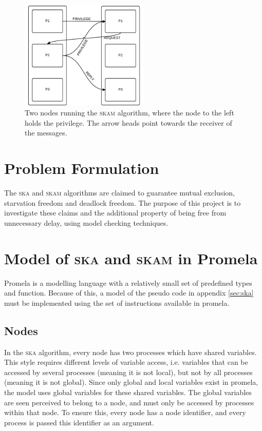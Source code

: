 \documentclass[a4paper,10pt]{llncs}
\begin{document}
\begin{figure}[t]
\begin{center}
\includegraphics[width=0.55\textwidth]{Skaskam.pdf}
 \caption[Close up of \textit{Hemidactylus} sp.]
   {Two nodes running the \textsc{skam} algorithm, where the node to the left holds the privilege. The arrow heads point towards the receiver of the messages.}
\end{center}
\end{figure}



\section{Problem Formulation}
The \textsc{ska} and \textsc{skam} algorithms are claimed to guarantee mutual exclusion, starvation freedom and deadlock freedom. The purpose of this project is to investigate these claims and the additional property of being free from unnecessary delay, using model checking techniques. 

\section{Model of \textsc{ska} and \textsc{skam} in Promela}
Promela is a modelling language with a relatively small set of predefined types and function. Because of this, a model of the pseudo code in appendix \ref{sec:ska} must be implemented using the set of instructions available in promela.


\subsection{Nodes}
In the \textsc{ska} algorithm, every node has two processes which have shared variables. This style requires different levels of variable access, i.e. variables that can be accessed by several processes (meaning it is not local), but not by all processes (meaning it is not global). Since only global and local variables exist in promela, the model uses global variables for these shared variables. The global variables are seen perceived to belong to a node, and must only be accessed by processes within that node. To ensure this, every node has a node identifier, and every process is passed this identifier as an argument. 
\end{document}
